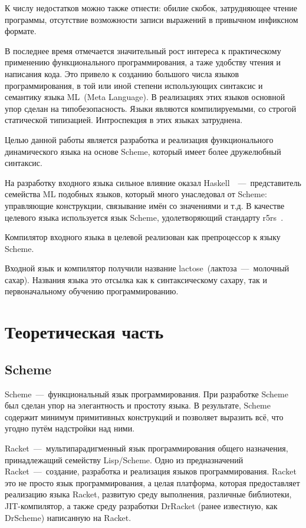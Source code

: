 \documentclass[12pt,a4paper,oneside]{extarticle}
\begin{document}
    К числу недостатков можно также отнести: обилие скобок, затрудняющее чтение программы, отсутствие возможности записи выражений в привычном инфиксном формате.

    В последнее время отмечается значительный рост интереса к практическому применению функционального программирования, а таже удобству чтения и написания кода.
    Это привело к созданию большого числа языков программирования, в той или иной степени использующих синтаксис и семантику языка ML~(Meta Language).
    В реализациях этих языков основной упор сделан на типобезопасность.
    Языки являются компилируемыми, со строгой статической типизацией.
    Интроспекция в этих языках затруднена.

    Целью данной работы является разработка и реализация функционального динамического языка на основе Scheme, который имеет более дружелюбный синтаксис.

    На разработку входного языка сильное влияние оказал Haskell~\cite{haskell}~---~представитель семейства ML подобных языков, который много унаследовал от Scheme: управляющие конструкции, связывание имён со значениями и т.д.
    В качестве целевого языка используется язык Scheme, удолетворяющий стандарту r5rs~\cite{r5rs}.

    Компилятор входного языка в целевой реализован как препроцессор к языку Scheme.

    Входной язык и компилятор получили название lactose~(лактоза~---~молочный сахар).
    Названия языка это отсылка как к синтаксическому сахару, так и первоначальному обучению программированию.
\clearpage

\section{Теоретическая часть}
    \subsection{Scheme}
        Scheme~---~функциональный язык программирования.
        При разработке Scheme был сделан упор на элегантность и простоту языка.
        В результате, Scheme содержит минимум примитивных конструкций и позволяет выразить всё, что угодно путём надстройки над ними.

        Racket~---~мультипарадигменный язык программирования общего назначения, принадлежащий семейству Lisp/Scheme.
        Одно из предназначений Racket~---~создание, разработка и реализация языков программирования.
        Racket это не просто язык программирования, а целая платформа, которая предоставляет реализацию языка Racket, развитую среду выполнения, различные библиотеки, JIT-компилятор, а также среду разработки DrRacket (ранее известную, как DrScheme) написанную на Racket.
\end{document}
